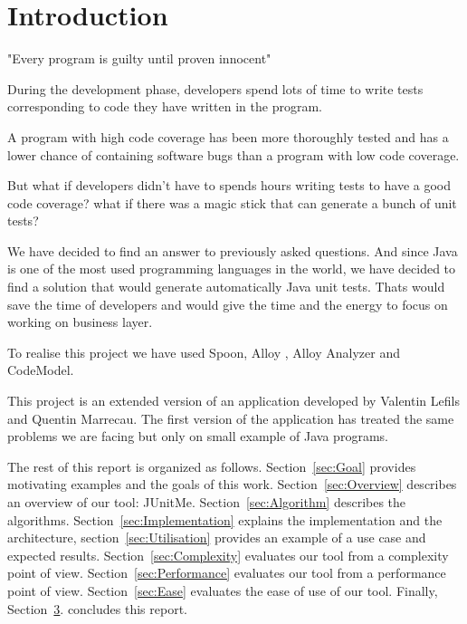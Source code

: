 \chapter*{Introduction}
	\thispagestyle{introduction}
	"Every program is guilty until proven innocent"
	
	During the development phase, developers spend lots of time to write tests corresponding to code they have written in the program.
	
	A program with high code coverage has been more thoroughly tested and has a lower chance of containing software bugs than a program with low code coverage.\cite{CodeCoverage}
	
	But what if developers didn't have to spends hours writing tests to have a good code coverage? what if there was a magic stick that can generate a bunch of unit tests? 
	
We have decided to find an answer to previously asked questions. And since Java is one of the most used programming languages in the world, we have decided to find a solution that would generate automatically Java unit tests. Thats would save the time of developers and would give the time and the energy to focus on working on business layer.

To realise this project we have used Spoon, Alloy , Alloy Analyzer and CodeModel.

This project is an extended version of an application developed by Valentin Lefils and Quentin Marrecau. The first version of the application has treated the same problems we are facing but only on small example of Java programs.

The rest of this report is organized as follows. Section~\ref{sec:Goal} provides motivating examples and the goals of this work.
Section~\ref{sec:Overview} describes an overview of our tool: JUnitMe.
Section~\ref{sec:Algorithm} describes the algorithms. Section~\ref{sec:Implementation} explains the implementation and the architecture, section~\ref{sec:Utilisation} provides an example of a use case and expected results.
Section~\ref{sec:Complexity} evaluates our tool from a complexity point of view. Section~\ref{sec:Performance} evaluates our tool from a performance point of view. Section~\ref{sec:Ease} evaluates the ease of use of our tool.
Finally, Section~\hyperref[ch:Conclusion]{3}. concludes this report.